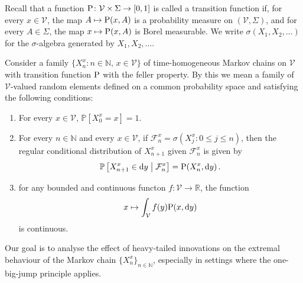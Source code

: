 \documentclass[preprint,12pt]{elsarticle}
\theoremstyle{definition}
\theoremstyle{remark}
\newcommand{\xbf}{{ x}}
\newcommand{\ybf}{{ y}}
\newcommand{\Xbf}{{ X}}
\newcommand{\1}{{\mathbf 1}}
\numberwithin{equation}{section}
\newcommand{\Pbb}{\mathbb{P}}
\newcommand{\ud}{{\rm d}}
\newcommand{\Prm}{{\rm P}}
\newcommand{\Vcal}{\mathcal{V}}
\begin{document}
  Recall that a function $\Prm \colon \Vcal \times \Sigma\to [0,1]$ 
  is called a transition function if, 
  for every $\xbf \in \Vcal$, the map $A \mapsto \Prm(\xbf, A)$ is a 
  probability measure on $(\Vcal,\Sigma)$, 
  and for every $A \in \Sigma$, the map $\xbf \mapsto \Prm(\xbf, A)$ is Borel measurable.
  We write $\sigma(X_1, X_2, \dots)$ for the $\sigma$-algebra generated by $X_1, X_2, \dots$.

  Consider a family 
  $\{\Xbf_n^{\xbf} : n \in \mathbb{N},\, \xbf \in \Vcal\}$ 
  of time-homogeneous Markov chains on $\Vcal$ 
  with transition function $\Prm$ with the feller property.
  By this we mean a family of $\Vcal$-valued random elements 
  defined on a common probability space and satisfying the following conditions:
  \begin{enumerate}
    \item For every $\xbf \in \Vcal$, $\Pbb[\Xbf_0^{\xbf} = \xbf] = 1$.

    \item For every $n \in \mathbb{N}$ and every $\xbf \in \Vcal$, 
      if $\mathcal{F}_n^{\xbf} = \sigma(\Xbf_j^{\xbf} : 0\leq j \leq n)$,
      then the regular conditional distribution of $\Xbf_{n+1}^{\xbf}$ 
      given $\mathcal{F}_n^{\xbf}$ is given by
      \begin{equation}
   		  \Pbb \left[\Xbf_{n+1}^{\xbf} \in \ud \ybf \;\middle|\; \mathcal{F}_n^{\xbf} \right] 
   		  = \Prm\!\left(\Xbf_n^{\xbf}, \ud \ybf\right).
      \end{equation}
      \item for any bounded and continuous functon $f \colon \Vcal \to \mathbb{R}$,
        the function
        \begin{equation*}
            x \mapsto \int_\Vcal f(y) \Prm(x, \mathrm{d}y)
        \end{equation*}
        is continuous.
  \end{enumerate}

  Our goal is to analyse the effect of heavy-tailed innovations on the extremal 
  behaviour of the Markov chain $\{\Xbf_n^{\xbf}\}_{n \in \mathbb{N}}$, 
  especially in settings where the one-big-jump principle applies.
\end{document}

